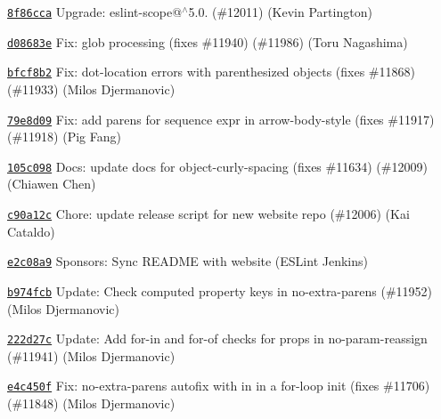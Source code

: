 \begin{DoxyItemize}
\item \href{https://github.com/eslint/eslint/commit/8f86ccaa89daf10123370868c5dcb48c1fcbef7d}{\texttt{ {\ttfamily 8f86cca}}} Upgrade\+: eslint-\/scope@$^\wedge$5.0. (\#12011) (Kevin Partington)
\item \href{https://github.com/eslint/eslint/commit/d08683e3c807f92daf266894093c70f8d5ac6afa}{\texttt{ {\ttfamily d08683e}}} Fix\+: glob processing (fixes \#11940) (\#11986) (Toru Nagashima)
\item \href{https://github.com/eslint/eslint/commit/bfcf8b21011466b570b536ca31ec10fd228b3dca}{\texttt{ {\ttfamily bfcf8b2}}} Fix\+: dot-\/location errors with parenthesized objects (fixes \#11868) (\#11933) (Milos Djermanovic)
\item \href{https://github.com/eslint/eslint/commit/79e8d099bbbebfa4d804484eeeeea9c074ede870}{\texttt{ {\ttfamily 79e8d09}}} Fix\+: add parens for sequence expr in arrow-\/body-\/style (fixes \#11917) (\#11918) (Pig Fang)
\item \href{https://github.com/eslint/eslint/commit/105c098f3cece8b83ab8d1566b8ea41dd94a60b9}{\texttt{ {\ttfamily 105c098}}} Docs\+: update docs for object-\/curly-\/spacing (fixes \#11634) (\#12009) (Chiawen Chen)
\item \href{https://github.com/eslint/eslint/commit/c90a12c283698befcafd2c86f8bd8942428fe80b}{\texttt{ {\ttfamily c90a12c}}} Chore\+: update release script for new website repo (\#12006) (Kai Cataldo)
\item \href{https://github.com/eslint/eslint/commit/e2c08a9c8d86238955ecc8fd5a626584ee91eba5}{\texttt{ {\ttfamily e2c08a9}}} Sponsors\+: Sync R\+E\+A\+D\+ME with website (E\+S\+Lint Jenkins)
\item \href{https://github.com/eslint/eslint/commit/b974fcbd3321ab382a914520018d4c051b2e5c62}{\texttt{ {\ttfamily b974fcb}}} Update\+: Check computed property keys in no-\/extra-\/parens (\#11952) (Milos Djermanovic)
\item \href{https://github.com/eslint/eslint/commit/222d27c32a6d6d8828233b3b99e93ecefa94c603}{\texttt{ {\ttfamily 222d27c}}} Update\+: Add for-\/in and for-\/of checks for props in no-\/param-\/reassign (\#11941) (Milos Djermanovic)
\item \href{https://github.com/eslint/eslint/commit/e4c450febc9bd77b33f6473667afa9f955be6b71}{\texttt{ {\ttfamily e4c450f}}} Fix\+: no-\/extra-\/parens autofix with {\ttfamily in} in a for-\/loop init (fixes \#11706) (\#11848) (Milos Djermanovic)

\end{DoxyItemize}
